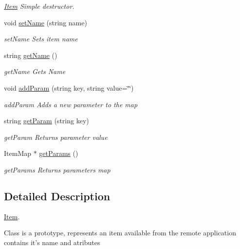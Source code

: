 \begin{DoxyCompactItemize}
\begin{DoxyCompactList}\small\item\em \hyperlink{class_item}{\-Item} \-Simple destructor. \end{DoxyCompactList}\item 
void \hyperlink{class_item_a5dcdff1db4c66ca22bd6a3f826c69644}{set\-Name} (string name)
\begin{DoxyCompactList}\small\item\em set\-Name \-Sets item name \end{DoxyCompactList}\item 
string \hyperlink{class_item_a63d7f2148b699e539aae354b01559811}{get\-Name} ()
\begin{DoxyCompactList}\small\item\em get\-Name \-Gets \-Name \end{DoxyCompactList}\item 
void \hyperlink{class_item_a8bc2de5cc28b66382c88b617658ef75b}{add\-Param} (string key, string value=\char`\"{}\char`\"{})
\begin{DoxyCompactList}\small\item\em add\-Param \-Adds a new parameter to the map \end{DoxyCompactList}\item 
string \hyperlink{class_item_a3605775840abc78a71bd206b7408d3cf}{get\-Param} (string key)
\begin{DoxyCompactList}\small\item\em get\-Param \-Returns parameter value \end{DoxyCompactList}\item 
\-Item\-Map $\ast$ \hyperlink{class_item_a3cd3359723df8ed59f9f8de97c773d7b}{get\-Params} ()
\begin{DoxyCompactList}\small\item\em get\-Params \-Returns parameters map \end{DoxyCompactList}\end{DoxyCompactItemize}


\subsection{\-Detailed \-Description}
\hyperlink{class_item}{\-Item}. 

\-Class is a prototype, represents an item available from the remote application contains it's name and atributes 

